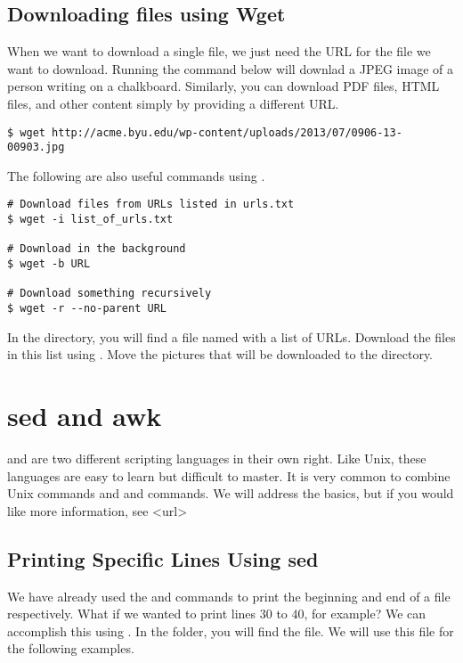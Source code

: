 \subsection*{Downloading files using Wget}

When we want to download a single file, we just need the URL for the file we want to download. Running the command below will downlad a JPEG image of a person writing on a chalkboard. Similarly, you can download PDF files, HTML files, and other content simply by providing a different URL. 

\begin{lstlisting}
$ wget http://acme.byu.edu/wp-content/uploads/2013/07/0906-13-00903.jpg
\end{lstlisting}

The following are also useful commands using .

\begin{lstlisting}
# Download files from URLs listed in urls.txt
$ wget -i list_of_urls.txt

# Download in the background
$ wget -b URL

# Download something recursively
$ wget -r --no-parent URL
\end{lstlisting}

\begin{problem}
In the  directory, you will find a file named  with a list of URLs. Download the files in this list using . Move the pictures that will be downloaded to the  directory.
\end{problem}

\section*{sed and awk}
 and  are two different scripting languages in their own right. Like Unix, these languages are easy to learn but difficult to master. It is very common to combine Unix commands and  and  commands. We will address the basics, but if you would like more information, see <url>

\subsection*{Printing Specific Lines Using sed}
We have already used the  and  commands to print the beginning and end of a file respectively. What if we wanted to print lines $30$ to $40$, for example? We can accomplish this using . In the  folder, you will find the  file. We will use this file for the following examples.

